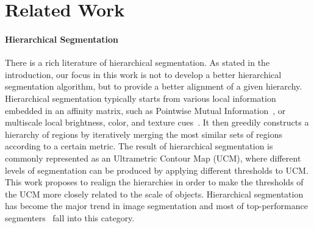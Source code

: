 



\section{Related Work}
\label{scale:sec:related}
\paragraph{Hierarchical Segmentation}
There is a rich literature of hierarchical segmentation.
As stated in the introduction, our focus in this work is not to develop a better hierarchical
segmentation algorithm, but to provide a better alignment of a given hierarchy. 
Hierarchical segmentation typically starts from various local information embedded in an affinity matrix,
such as Pointwise Mutual Information~\citep{isola2014crisp}, or multiscale local brightness, color, and texture cues~\citep{arbelaez2011contour}.
It then greedily constructs a hierarchy of regions by iteratively merging the most similar sets of regions
according to a certain metric. 
The result of hierarchical segmentation is commonly represented as an Ultrametric Contour Map (UCM),
where different levels of segmentation can be produced by applying different thresholds to UCM.
This work proposes to realign the hierarchies in order to make the thresholds of the UCM more closely related
to the scale of objects.
Hierarchical segmentation has become the major trend in image segmentation and most of top-performance segmenters~\citep{arbelaez2011contour,arbelaez2014multiscale,Ren2013,kim2013learning} fall into this category. 

